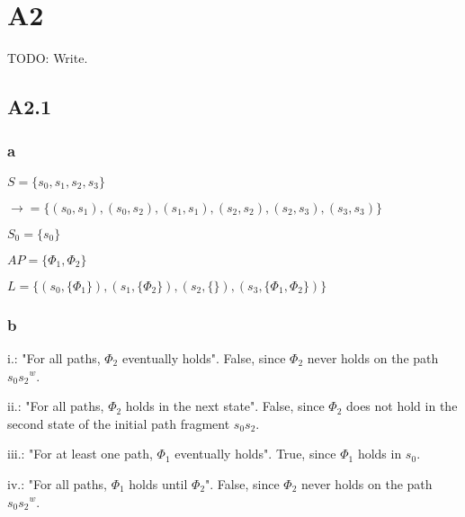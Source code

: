 
\section{A2}

TODO: Write.

\subsection{A2.1}

\subsubsection{a}

$S = \{s_0, s_1, s_2, s_3\}$

$\rightarrow = \{
  (s_0, s_1), (s_0, s_2),
  (s_1, s_1),
  (s_2, s_2), (s_2, s_3),
  (s_3, s_3)
\}$

$S_0 = \{s_0\}$

$AP = \{\Phi_1, \Phi_2\}$

$L = \{
  (s_0, \{\Phi_1\}),
  (s_1, \{\Phi_2\}),
  (s_2, \{\}),
  (s_3, \{\Phi_1, \Phi_2\})
\}$

\subsubsection{b}

i.: "For all paths, $\Phi_2$ eventually holds". False, since $\Phi_2$ never holds on the path $s_0{s_2}^w$.

ii.: "For all paths, $\Phi_2$ holds in the next state". False, since $\Phi_2$ does not hold
     in the second state of the initial path fragment $s_0s_2$.

iii.: "For at least one path, $\Phi_1$ eventually holds". True, since $\Phi_1$ holds in $s_0$.

iv.: "For all paths, $\Phi_1$ holds until $\Phi_2$". False, since $\Phi_2$ never holds on the path $s_0{s_2}^w$.

